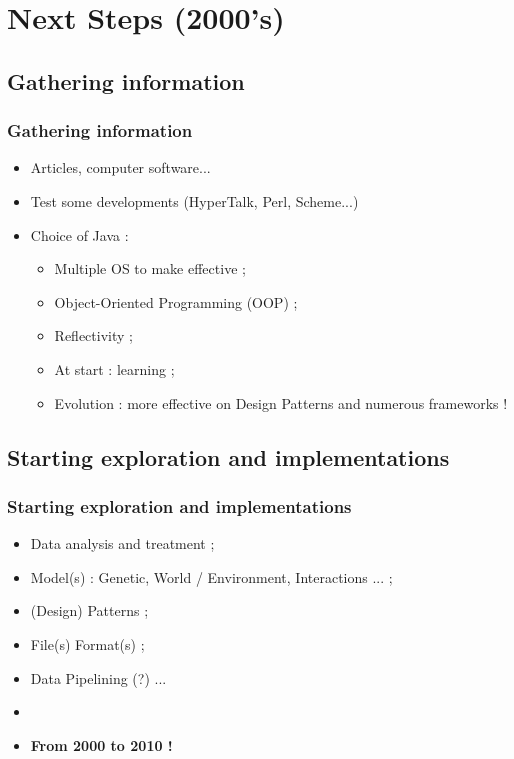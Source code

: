 \documentclass{beamer}
\begin{document}
\def\titleSectionSecondPart{Next Steps (2000's)}
\section{\titleSectionSecondPart }
\def\titleSubSectionSecondPartOne{ Gathering information }
\subsection{ \titleSubSectionSecondPartOne }
\begin{frame}
	\frametitle{ \titleSubSectionSecondPartOne }
	\begin{itemize}
		\item Articles, computer software...
		\item Test some developments (HyperTalk, Perl, Scheme...)
		\item Choice of Java : 
		\begin{itemize}
			\item Multiple OS to make effective ; 
			\item Object-Oriented Programming (OOP) ; 
			\item Reflectivity ; 
			\item At start : learning ;
			\item Evolution : more effective on Design Patterns and numerous frameworks !
		\end{itemize}
	\end{itemize}
\end{frame}

\def\titleSubSectionSecondPartTwo{ Starting exploration and implementations }
\subsection{ \titleSubSectionSecondPartTwo }
\begin{frame}
	\frametitle{ \titleSubSectionSecondPartTwo }
	\begin{itemize}
		\item Data analysis and treatment ; 
		\item Model(s) : Genetic, World / Environment, Interactions ... ; 
		\item (Design) Patterns ; 
		\item File(s) Format(s) ; 
		\item Data Pipelining (?) ...
		\item[] 
		\item \textbf{From 2000 to 2010 !} 
	\end{itemize}
\end{frame}
\end{document}
